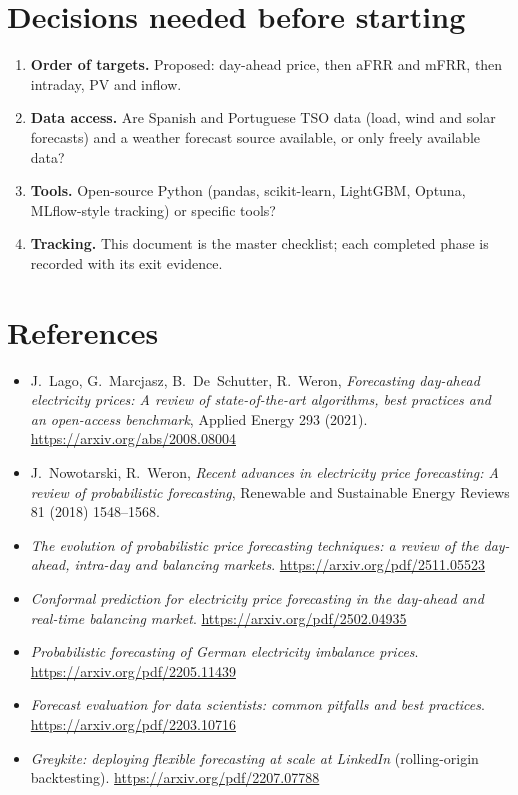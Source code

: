 \documentclass[11pt,a4paper]{article}
\begin{document}
\section{Decisions needed before starting}
\begin{enumerate}
\item \textbf{Order of targets.} Proposed: day-ahead price, then aFRR and mFRR, then intraday, PV and inflow.
\item \textbf{Data access.} Are Spanish and Portuguese TSO data (load, wind and solar forecasts) and a weather
  forecast source available, or only freely available data?
\item \textbf{Tools.} Open-source Python (pandas, scikit-learn, LightGBM, Optuna, MLflow-style tracking) or specific tools?
\item \textbf{Tracking.} This document is the master checklist; each completed phase is recorded with its exit evidence.
\end{enumerate}

\section*{References}
\begin{itemize}
\item J.~Lago, G.~Marcjasz, B.~De~Schutter, R.~Weron, \emph{Forecasting day-ahead electricity prices: A review of
  state-of-the-art algorithms, best practices and an open-access benchmark}, Applied Energy 293 (2021).
  \url{https://arxiv.org/abs/2008.08004}
\item J.~Nowotarski, R.~Weron, \emph{Recent advances in electricity price forecasting: A review of probabilistic
  forecasting}, Renewable and Sustainable Energy Reviews 81 (2018) 1548--1568.
\item \emph{The evolution of probabilistic price forecasting techniques: a review of the day-ahead, intra-day and
  balancing markets}. \url{https://arxiv.org/pdf/2511.05523}
\item \emph{Conformal prediction for electricity price forecasting in the day-ahead and real-time balancing market}.
  \url{https://arxiv.org/pdf/2502.04935}
\item \emph{Probabilistic forecasting of German electricity imbalance prices}. \url{https://arxiv.org/pdf/2205.11439}
\item \emph{Forecast evaluation for data scientists: common pitfalls and best practices}.
  \url{https://arxiv.org/pdf/2203.10716}
\item \emph{Greykite: deploying flexible forecasting at scale at LinkedIn} (rolling-origin backtesting).
  \url{https://arxiv.org/pdf/2207.07788}
\end{itemize}
\end{document}

